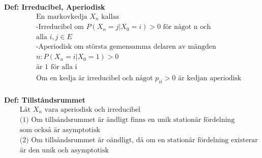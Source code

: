 \textbf{Def: Irreducibel, Aperiodisk}
\begin{align*}
  &\quad  \text{En markovkedja ${X_n}$ kallas } \\
  &\quad  \text{-Irreducibel om $P(X_n=j|X_0=i)>0$ för något n och} \\
  &\quad  \text{alla $i,j\in{E}$ } \\
  &\quad  \text{-Aperiodisk om största gemensamma delaren av mängden} \\
  &\quad  {n: P(X_n=i|X_0=1)>0} \\
  &\quad  \text{är 1 för alla i } \\
  &\quad  \\
  &\quad  \text{Om en kedja är irreducibel och något $p_{ii}>0$ är kedjan aperiodisk} \\
\end{align*}

\textbf{Def: Tillståndsrummet}
\begin{align*}
  &\quad  \text{Låt ${X_n}$ vara aperiodisk och irreducibel} \\
  &\quad  \text{(1) Om tillsåndsrummet är ändligt finns en unik stationär fördelning} \\
  &\quad  \text{som också är asymptotisk} \\
  &\quad  \text{(2) Om tillsåndsrummet är oändligt, då om en stationär fördelning existerar} \\
  &\quad  \text{är den unik och asymptotisk} \\
\end{align*}

